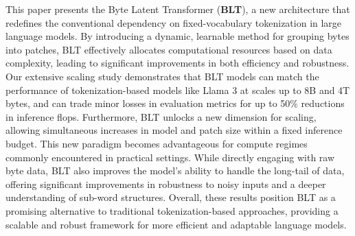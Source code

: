 This paper presents the Byte Latent Transformer (\textbf{BLT}), a new architecture that redefines the conventional dependency on fixed-vocabulary tokenization in large language models. By introducing a dynamic, learnable method for grouping bytes into patches, {\textsc BLT} effectively allocates computational resources based on data complexity, leading to significant improvements in both efficiency and robustness. Our extensive scaling study demonstrates that {\textsc BLT} models can match the performance of tokenization-based models  like Llama 3 at scales up to 8B and 4T bytes, and can trade minor losses in evaluation metrics for up to 50\% reductions in inference flops. Furthermore, {\textsc BLT} unlocks a new dimension for scaling, allowing simultaneous increases in model and patch size within a fixed inference budget. This new paradigm becomes advantageous for compute regimes commonly encountered in practical settings. While directly engaging with raw byte data, {\textsc BLT} also improves the model's ability to handle the long-tail of data, offering significant improvements in robustness to noisy inputs and a deeper understanding of sub-word structures. Overall, these results position {\textsc BLT} as a promising alternative to traditional tokenization-based approaches, providing a scalable and robust framework for more efficient and adaptable language models.

